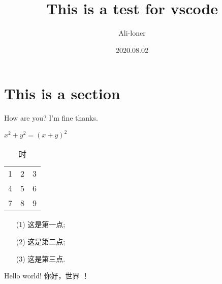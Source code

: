 \documentclass[a4paper]{article}
\title{This is a test for vscode}
\author{Ali-loner}
\date{2020.08.02}
\begin{document}
    \maketitle
    \begin{abstract}
        \lipsum[2]
    \end{abstract}
    \tableofcontents


    \section{This is a section}\label{sec:this-is-a-section}
    How are you?
    I'm fine thanks.

    $x^2+y^2 = (x+y)^2$
    \begin{table}[htbp]
        \centering
        \caption{时}
        \begin{tabular}{ccc}
            1 & 2 & 3 \\
            4 & 5 & 6 \\
            7 & 8 & 9
        \end{tabular}\label{tab:table}
    \end{table}
    \begin{enumerate}
        \item[(1)] 这是第一点;
        \item[(2)] 这是第二点;
        \item[(3)] 这是第三点.
    \end{enumerate}
    Hello world!
    你好，世界 ！
\end{document}

